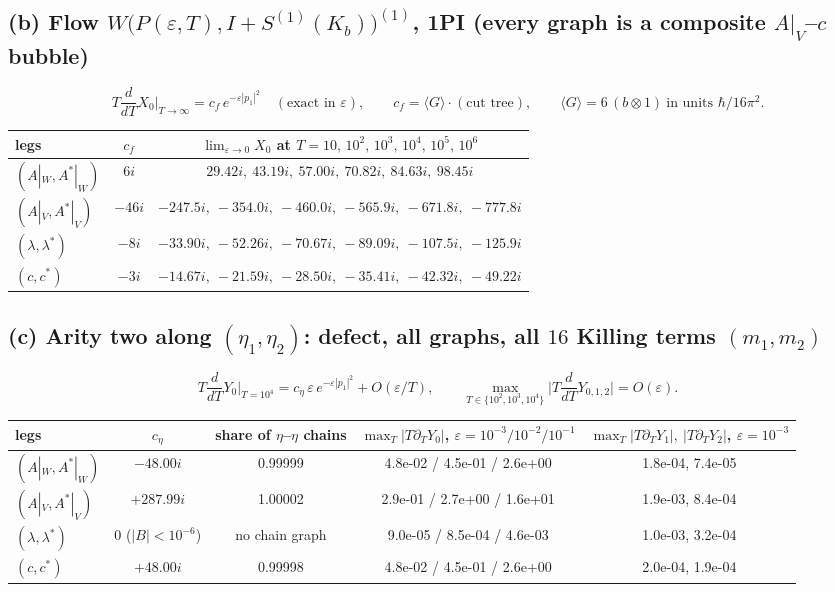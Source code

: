 \documentclass[10pt]{article}
\begin{document}
\subsection*{(b) Flow $W\big(P(\varepsilon,T),I+S^{(1)}(K_b)\big)^{(1)}$, 1PI (every graph is a composite $A|_V$--$c$ bubble)}
\[
T\frac{d}{dT}X_0\Big|_{T\to\infty}=c_f\,e^{-\varepsilon|p_1|^2}\quad(\text{exact in }\varepsilon),\qquad
c_f=\langle G\rangle\cdot(\text{cut tree}),\qquad \langle G\rangle=6\,(b\otimes1)\ \text{in units }\hbar/16\pi^2 .
\]
{\small
\begin{tabular}{lcc}
\toprule
legs & $c_f$ & $\lim_{\varepsilon\to0}X_0$ at $T=10,\,10^2,\,10^3,\,10^4,\,10^5,\,10^6$\\
\midrule
$(A|_W,A^*|_W)$ & $6i$ & $29.42i,\ 43.19i,\ 57.00i,\ 70.82i,\ 84.63i,\ 98.45i$\\
$(A|_V,A^*|_V)$ & $-46i$ & $-247.5i,\ -354.0i,\ -460.0i,\ -565.9i,\ -671.8i,\ -777.8i$\\
$(\lambda,\lambda^*)$ & $-8i$ & $-33.90i,\ -52.26i,\ -70.67i,\ -89.09i,\ -107.5i,\ -125.9i$\\
$(c,c^*)$ & $-3i$ & $-14.67i,\ -21.59i,\ -28.50i,\ -35.41i,\ -42.32i,\ -49.22i$\\
\bottomrule
\end{tabular}}

\subsection*{(c) Arity two along $(\eta_1,\eta_2)$: defect, all graphs, all $16$ Killing terms $(m_1,m_2)$}
\[
T\frac{d}{dT}Y_0\Big|_{T=10^4}=c_\eta\,\varepsilon\,e^{-\varepsilon|p_1|^2}+O(\varepsilon/T),\qquad
\max_{T\in\{10^2,10^3,10^4\}}\Big|T\frac{d}{dT}Y_{0,1,2}\Big|=O(\varepsilon).
\]
{\footnotesize
\begin{tabular}{lcccc}
\toprule
legs & $c_\eta$ & share of $\eta$--$\eta$ chains & $\max_T|T\partial_TY_0|$, $\varepsilon=10^{-3}/10^{-2}/10^{-1}$ & $\max_T|T\partial_TY_1|,\ |T\partial_TY_2|$, $\varepsilon=10^{-3}$\\
\midrule
$(A|_W,A^*|_W)$ & $-48.00i$ & 0.99999 & 4.8e-02 / 4.5e-01 / 2.6e+00 & 1.8e-04, 7.4e-05\\
$(A|_V,A^*|_V)$ & $+287.99i$ & 1.00002 & 2.9e-01 / 2.7e+00 / 1.6e+01 & 1.9e-03, 8.4e-04\\
$(\lambda,\lambda^*)$ & $0$ ($|B|<10^{-6}$) & no chain graph & 9.0e-05 / 8.5e-04 / 4.6e-03 & 1.0e-03, 3.2e-04\\
$(c,c^*)$ & $+48.00i$ & 0.99998 & 4.8e-02 / 4.5e-01 / 2.6e+00 & 2.0e-04, 1.9e-04\\
\bottomrule
\end{tabular}}
\end{document}
